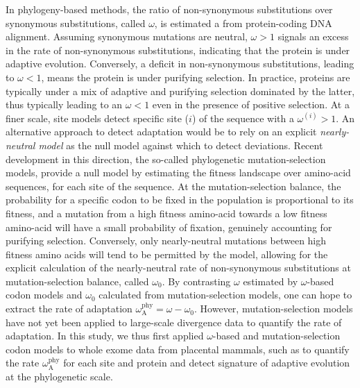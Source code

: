 \documentclass{article}
\begin{document}
    In phylogeny-based methods, the ratio of non-synonymous substitutions over synonymous substitutions, called $\omega$, is estimated a from protein-coding DNA alignment\cite{muse_likelihood_1994,goldman_codonbased_1994}.
    Assuming synonymous mutations are neutral, $\omega>1$ signals an excess in the rate of non-synonymous substitutions, indicating that the protein is under adaptive evolution.
    Conversely, a deficit in non-synonymous substitutions, leading to $\omega<1$, means the protein is under purifying selection.
    In practice, proteins are typically under a mix of adaptive and purifying selection dominated by the latter, thus typically leading to an $\omega<1$ even in the presence of positive selection.
    At a finer scale, site models detect specific site ($i$) of the sequence with a $\omega^{(i)}>1$\cite{yang_codonsubstitution_2000, kosiol_patterns_2008}.
    An alternative approach to detect adaptation would be to rely on an explicit \textit{nearly-neutral model} as the null model against which to detect deviations.
    Recent development in this direction, the so-called phylogenetic mutation-selection models, provide a null model by estimating the fitness landscape over amino-acid sequences, for each site of the sequence\cite{yang_mutationselection_2008, halpern_evolutionary_1998, rodrigue_mechanistic_2010}.
    At the mutation-selection balance, the probability for a specific codon to be fixed in the population is proportional to its fitness, and a mutation from a high fitness amino-acid towards a low fitness amino-acid will have a small probability of fixation, genuinely accounting for purifying selection.
    Conversely, only nearly-neutral mutations between high fitness amino acids will tend to be permitted by the model, allowing for the explicit calculation of the nearly-neutral rate of non-synonymous substitutions at mutation-selection balance, called $\omega_{0}$\cite{spielman_relationship_2015, rodrigue_detecting_2017}.
    By contrasting $\omega$ estimated by $\omega$-based codon models and $\omega_{0}$ calculated from mutation-selection models, one can hope to extract the rate of adaptation $\omega_{\mathrm{A}}^{\mathrm{phy}} = \omega - \omega_{0}$.
    However, mutation-selection models have not yet been applied to large-scale divergence data to quantify the rate of adaptation\cite{rodrigue_detecting_2017}.
    In this study, we thus first applied $\omega$-based and mutation-selection codon models to whole exome data from placental mammals, such as to quantify the rate $\omega_{\mathrm{A}}^{\mathrm{phy}}$ for each site and protein and detect signature of adaptive evolution at the phylogenetic scale.
\end{document}
